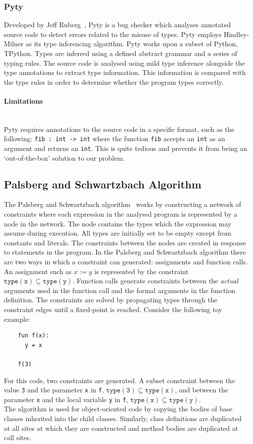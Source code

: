 \documentclass[12pt, titlepage]{article}
\begin{document}
\subsubsection{Pyty}
Developed by Jeff Ruberg~\cite{pyty}, Pyty is a bug checker which analyses annotated source code to detect errors related to the misuse of types. Pyty employs Hindley-Milner as its type inferencing algorithm. Pyty works upon a subset of Python, TPython. Types are inferred using a defined abstract grammar and a series of typing rules. The source code is analysed using mild type inference alongside the type annotations to extract type information. This information is compared with the type rules in order to determine whether the program types correctly.
\paragraph{Limitations}\mbox{}\\
Pyty requires annotations to the source code in a specific format, such as the following: \texttt{fib : int -> int} where the function \texttt{fib} accepts an \texttt{int} as an argument and returns an \texttt{int}. This is quite tedious and prevents it from being an `out-of-the-box' solution to our problem.

\subsection{Palsberg and Schwartzbach Algorithm}
The Palsberg and Schwartzbach algorithm~\cite{Palsbergstatictyping} works by constructing a network of constraints where each expression in the analysed program is represented by a node in the network. The node contains the types which the expression may assume during execution. All types are initially set to be empty except from constants and literals. The constraints between the nodes are created in response to statements in the program. In the Palsberg and Schwartzbach algorithm there are two ways in which a constraint can generated: assignments and function calls. An assignment such as $x := y$ is represented by the constraint $\mathtt{type(x) \subseteq type(y)}$. Function calls generate constraints between the \textit{actual} arguments used in the function call and the formal arguments in the function definition. The constraints are solved by propagating types through the constraint edges until a fixed-point is reached. Consider the following toy example: 
\begin{lstlisting}
    fun f(x):
      y = x
      
    f(3)
\end{lstlisting}
For this code, two constraints are generated. A subset constraint between the value \texttt{3} and the parameter \texttt{x} in \texttt{f}, $\mathtt{type(3) \subseteq type(x)}$, and between the parameter \texttt{x} and the local variable \texttt{y} in \texttt{f}, $\mathtt{type(x) \subseteq type(y)}$.  \\
\indent The algorithm is used for object-oriented code by copying the bodies of base classes inherited into the child classes. Similarly, class definitions are duplicated at all sites at which they are constructed and method bodies are duplicated at call sites.
\end{document}
